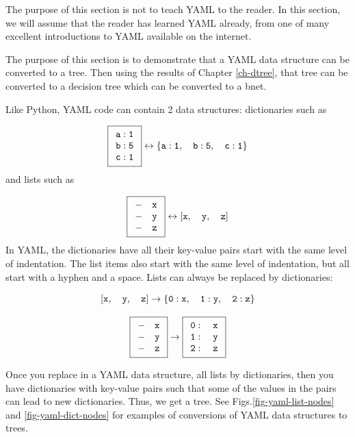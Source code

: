 The purpose of this section is not to teach
YAML to the reader.
In this section, we will
assume that the reader has learned YAML already,
from one of many excellent introductions to YAML
available on the internet.


The purpose of this section is to
demonstrate that a YAML data structure can be converted to
a tree. Then using
the results of Chapter \ref{ch-dtree}, that tree can be converted to a decision tree which can be converted to a bnet.

Like Python, YAML code 
can contain 2 data structures: dictionaries
such as 

$$\boxed{\begin{array}{l}
{\tt a:1}\\
{\tt b:5}\\
{\tt c:1}
\end{array}}
\leftrightarrow
{\tt \{a:1,\quad b:5,\quad c:1\}} 
$$
and lists such as

$$
\boxed{
\begin{array}{l}
{\tt - \quad x}\\
{\tt -\quad y}\\
{\tt -\quad z}
\end{array}}
\leftrightarrow
{\tt [x,\quad y,\quad z]}
$$
In YAML, the dictionaries
have all their key-value
pairs start with the same level of indentation.
The list items also start with
the same level of indentation, but all start with a hyphen and a space.
Lists can always be replaced by dictionaries:

$${\tt [x,\quad y,\quad z] \rightarrow
\{0:x, \quad 1:y,\quad 2:z\}}
$$

$$
\boxed{
\begin{array}{l}
{\tt - \quad x}\\
{\tt -\quad y}\\
{\tt -\quad z}
\end{array}}
\rightarrow
\boxed{
\begin{array}{l}
{\tt 0: \quad x}\\
{\tt 1: \quad y}\\
{\tt 2:\quad z}
\end{array}}
$$

Once you replace in
a YAML data structure, all lists
by dictionaries,
then you have dictionaries 
with key-value pairs such that
some of the values in the pairs can lead to new dictionaries. Thus, we get a tree. See Figs.\ref{fig-yaml-list-nodes}
and \ref{fig-yaml-dict-nodes}
for examples of conversions
of YAML data structures to trees.


